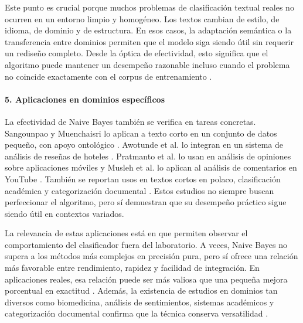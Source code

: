 Este punto es crucial porque muchos problemas de clasificación textual reales no ocurren en un entorno limpio y homogéneo. Los textos cambian de estilo, de idioma, de dominio y de estructura. En esos casos, la adaptación semántica o la transferencia entre dominios permiten que el modelo siga siendo útil sin requerir un rediseño completo. Desde la óptica de efectividad, esto significa que el algoritmo puede mantener un desempeño razonable incluso cuando el problema no coincide exactamente con el corpus de entrenamiento \cite{KIM2018128,10.5555/1619645.1619732,Wang2007}.

\paragraph{5. Aplicaciones en dominios específicos}

La efectividad de Naive Bayes también se verifica en tareas concretas. Sangounpao y Muenchaisri lo aplican a texto corto en un conjunto de datos pequeño, con apoyo ontológico \cite{Sangounpao2019}. Awotunde et al. lo integran en un sistema de análisis de reseñas de hoteles \cite{Awotunde2023131}. Pratmanto et al. lo usan en análisis de opiniones sobre aplicaciones móviles y Musleh et al. lo aplican al análisis de comentarios en YouTube \cite{Pratmanto2020,Musleh2023}. También se reportan usos en textos cortos en polaco, clasificación académica y categorización documental \cite{Wawer20191321,Humaidi2023,Wang2007,Mendoza2011251}. Estos estudios no siempre buscan perfeccionar el algoritmo, pero sí demuestran que su desempeño práctico sigue siendo útil en contextos variados.

La relevancia de estas aplicaciones está en que permiten observar el comportamiento del clasificador fuera del laboratorio. A veces, Naive Bayes no supera a los métodos más complejos en precisión pura, pero sí ofrece una relación más favorable entre rendimiento, rapidez y facilidad de integración. En aplicaciones reales, esa relación puede ser más valiosa que una pequeña mejora porcentual en exactitud \cite{Awotunde2023131,Pratmanto2020,Musleh2023,Risal202335,Wawer20191321}. Además, la existencia de estudios en dominios tan diversos como biomedicina, análisis de sentimientos, sistemas académicos y categorización documental confirma que la técnica conserva versatilidad \cite{Han20062136,Wang2007,Mendoza2011251}.

